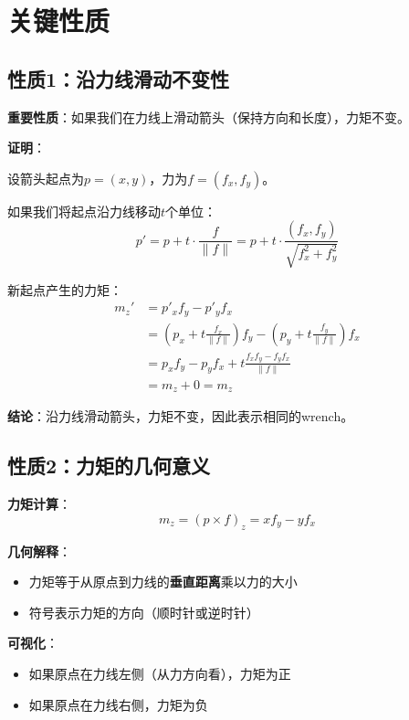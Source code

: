 \documentclass[12pt,a4paper]{article}
\begin{document}
\section{关键性质}

\subsection{性质1：沿力线滑动不变性}

\textbf{重要性质}：如果我们在力线上滑动箭头（保持方向和长度），力矩不变。

\textbf{证明}：

设箭头起点为$p = (x, y)$，力为$f = (f_x, f_y)$。

如果我们将起点沿力线移动$t$个单位：
\begin{equation}
p' = p + t \cdot \frac{f}{\|f\|} = p + t \cdot \frac{(f_x, f_y)}{\sqrt{f_x^2 + f_y^2}}
\end{equation}

新起点产生的力矩：
\begin{align}
m_z' &= p'_x f_y - p'_y f_x \\
&= (p_x + t \frac{f_x}{\|f\|}) f_y - (p_y + t \frac{f_y}{\|f\|}) f_x \\
&= p_x f_y - p_y f_x + t \frac{f_x f_y - f_y f_x}{\|f\|} \\
&= m_z + 0 = m_z
\end{align}

\textbf{结论}：沿力线滑动箭头，力矩不变，因此表示相同的wrench。

\subsection{性质2：力矩的几何意义}

\textbf{力矩计算}：
\begin{equation}
m_z = (p \times f)_z = x f_y - y f_x
\end{equation}

\textbf{几何解释}：
\begin{itemize}
\item 力矩等于从原点到力线的\textbf{垂直距离}乘以力的大小
\item 符号表示力矩的方向（顺时针或逆时针）
\end{itemize}

\textbf{可视化}：
\begin{itemize}
\item 如果原点在力线左侧（从力方向看），力矩为正
\item 如果原点在力线右侧，力矩为负
\end{itemize}
\end{document}
